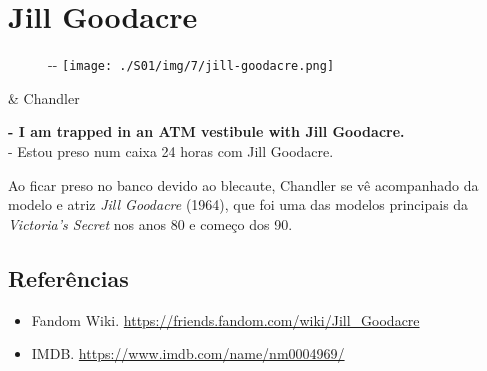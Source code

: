 \hypertarget{jill-goodacre}{%
\section{Jill Goodacre}\label{jill-goodacre}}

\begin{figure}[!ht]
  \begin{adjustwidth}{-\oddsidemargin-1in}{-\rightmargin}
    \centering
    \texttt{[image: ./S01/img/7/jill-goodacre.png]}
  \end{adjustwidth}
\end{figure}

\begin{tcolorbox}[enhanced,center upper,
    drop fuzzy shadow southeast, boxrule=0.3pt,
    lower separated=false,
    colframe=black!30!dialogoBorder,colback=white]
\begin{minipage}[c]{0.16\linewidth}
   & \centering \scriptsize{Chandler}
\end{minipage}
\hfill
\begin{minipage}[c]{0.8\linewidth}
  \textbf{- I am trapped in an ATM vestibule with Jill Goodacre.}\\
  - Estou preso num caixa 24 horas com Jill Goodacre.
\end{minipage}
\end{tcolorbox}

Ao ficar preso no banco devido ao blecaute, Chandler se vê acompanhado
da modelo e atriz \emph{Jill Goodacre} (1964), que foi uma das modelos
principais da \emph{Victoria's Secret} nos anos 80 e começo dos 90.

\hypertarget{referuxeancias}{%
\subsection{Referências}\label{referuxeancias}}

\begin{itemize}
\tightlist
\item
  \sloppy Fandom Wiki. \url{https://friends.fandom.com/wiki/Jill_Goodacre}
\item
  \sloppy IMDB. \url{https://www.imdb.com/name/nm0004969/}
\end{itemize}

